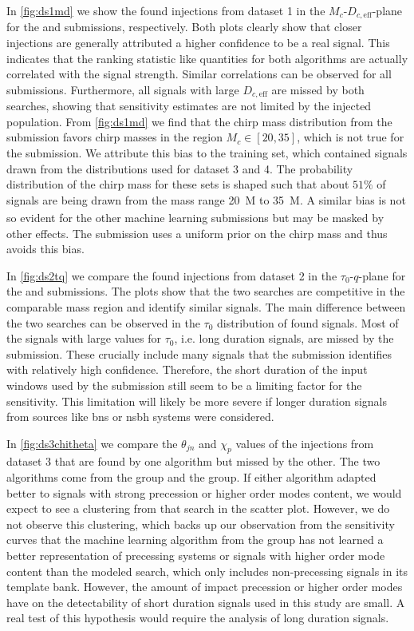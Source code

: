 In \autoref{fig:ds1md} we show the found injections from dataset 1 in the $M_c$-$D_{c,\text{eff}}$-plane for the \pycbc and \jena submissions, respectively. Both plots clearly show that closer injections are generally attributed a higher confidence to be a real signal. This indicates that the ranking statistic like quantities for both algorithms are actually correlated with the signal strength. Similar correlations can be observed for all submissions. Furthermore, all signals with large $D_{c,\text{eff}}$ are missed by both searches, showing that sensitivity estimates are not limited by the injected population. From \autoref{fig:ds1md} we find that the chirp mass distribution from the \jena submission favors chirp masses in the region $M_c\in[20, 35]$, which is not true for the \pycbc submission. We attribute this bias to the training set, which contained signals drawn from the distributions used for dataset 3 and 4. The probability distribution of the chirp mass for these sets is shaped such that about $51\%$ of signals are being drawn from the mass range \SI{20}{M_\odot} to \SI{35}{M_\odot}. A similar bias is not so evident for the other machine learning submissions but may be masked by other effects. The \pycbc submission uses a uniform prior on the chirp mass and thus avoids this bias.

In \autoref{fig:ds2tq} we compare the found injections from dataset 2 in the $\tau_0$-$q$-plane for the \pycbc and \jena submissions. The plots show that the two searches are competitive in the comparable mass region and identify similar signals. The main difference between the two searches can be observed in the $\tau_0$ distribution of found signals. Most of the signals with large values for $\tau_0$, i.e. long duration signals, are missed by the \jena submission. These crucially include many signals that the \pycbc submission identifies with relatively high confidence. Therefore, the short duration of the input windows used by the \jena submission still seem to be a limiting factor for the sensitivity. This limitation will likely be more severe if longer duration signals from sources like \acrshort{bns} or \acrshort{nsbh} systems were considered.

In \autoref{fig:ds3chitheta} we compare the $\theta_{jn}$ and $\chi_p$ values of the injections from dataset 3 that are found by one algorithm but missed by the other. The two algorithms come from the \pycbc group and the \jena group. If either algorithm adapted better to signals with strong precession or higher order modes content, we would expect to see a clustering from that search in the scatter plot. However, we do not observe this clustering, which backs up our observation from the sensitivity curves that the machine learning algorithm from the \jena group has not learned a better representation of precessing systems or signals with higher order mode content than the modeled \pycbc search, which only includes non-precessing signals in its template bank. However, the amount of impact precession or higher order modes have on the detectability of short duration signals used in this study are small. A real test of this hypothesis would require the analysis of long duration signals.


